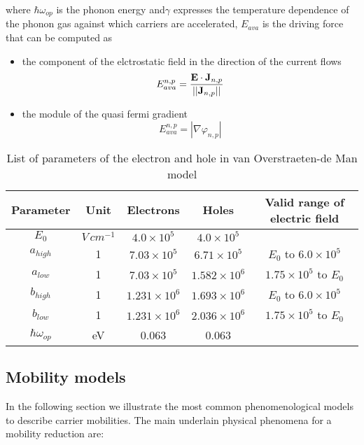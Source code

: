 where $\hbar \omega_{op}$ is the phonon energy and$\gamma$ expresses the temperature dependence of the phonon gas against which carriers are accelerated, $E_{ava}$ is the driving force that can be computed as
\begin{itemize}
\item the component of the elctrostatic field in the direction of the current flows
\begin{equation}
E_{ava}^{n,p} = \dfrac{\mathbf{E}\cdot\mathbf{J}_{n,p}}{||\mathbf{J}_{n,p}||}
\end{equation}
\item the module of the quasi fermi gradient
\begin{equation}
E_{ava}^{n,p} = |\nabla \varphi_{n,p}|
\end{equation}
\end{itemize}

\begin{table}[!h]
\centering
\begin{tabular}{ccccc}
\toprule
Parameter & Unit & Electrons & Holes  & Valid range of electric field\\
\midrule
$E_0$ & $V \, cm^{-1}$ & $4.0 \times 10^{5}$ & $4.0 \times 10^{5}$ & \\
$a_{high}$ & 1 & $7.03 \times 10^{5}$ & $6.71 \times 10^{5}$ & $E_0$ to $6.0 \times 10^{5}$\\
$a_{low}$ & 1 & $7.03 \times 10^{5}$ & $1.582 \times 10^{6}$ & $1.75 \times 10^{5}$ to $E_0$\\
$b_{high}$ & 1 & $1.231 \times 10^{6}$ & $1.693 \times 10^{6}$ & $E_0$ to $6.0 \times 10^{5}$\\
$b_{low}$ & 1 & $1.231 \times 10^{6}$ & $2.036 \times 10^{6}$ &$1.75 \times 10^{5}$ to $E_0$\\
$\hbar\omega_{op}$ & eV & 0.063 & 0.063\\
\bottomrule
\end{tabular}
\caption{List of parameters of the electron and hole in van Overstraeten-de Man model}
\end{table}



\subsection{Mobility models}

In the following section we illustrate the most common phenomenological models to describe carrier mobilities. The main underlain physical phenomena for a mobility reduction are:

